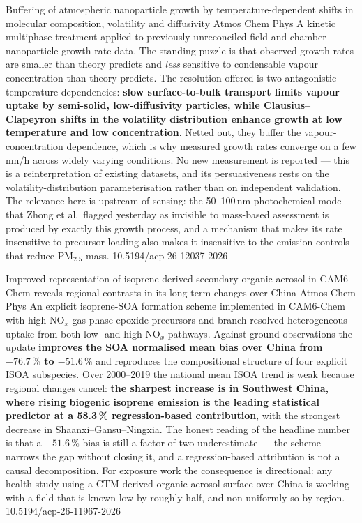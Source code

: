 \documentclass[10pt]{article}
\begin{document}
{Buffering of atmospheric nanoparticle growth by temperature-dependent shifts in molecular composition, volatility and diffusivity}
{Atmos Chem Phys}
{A kinetic multiphase treatment applied to previously unreconciled field and chamber
nanoparticle growth-rate data. The standing puzzle is that observed growth rates are
smaller than theory predicts and \emph{less} sensitive to condensable vapour
concentration than theory predicts. The resolution offered is two antagonistic
temperature dependencies: \textbf{slow surface-to-bulk transport limits vapour uptake by
semi-solid, low-diffusivity particles, while Clausius--Clapeyron shifts in the volatility
distribution enhance growth at low temperature and low concentration}. Netted out, they
buffer the vapour-concentration dependence, which is why measured growth rates converge
on a few nm/h across widely varying conditions. No new measurement is reported --- this
is a reinterpretation of existing datasets, and its persuasiveness rests on the
volatility-distribution parameterisation rather than on independent validation. The
relevance here is upstream of sensing: the 50--100\,nm photochemical mode that Zhong
et al.\ flagged yesterday as invisible to mass-based assessment is produced by exactly
this growth process, and a mechanism that makes its rate insensitive to precursor
loading also makes it insensitive to the emission controls that reduce PM$_{2.5}$ mass.}
{10.5194/acp-26-12037-2026}


{Improved representation of isoprene-derived secondary organic aerosol in CAM6-Chem reveals regional contrasts in its long-term changes over China}
{Atmos Chem Phys}
{An explicit isoprene-SOA formation scheme implemented in CAM6-Chem with high-NO$_x$
gas-phase epoxide precursors and branch-resolved heterogeneous uptake from both low- and
high-NO$_x$ pathways. Against ground observations the update \textbf{improves the SOA
normalised mean bias over China from $-76.7\,\%$ to $-51.6\,\%$} and reproduces the
compositional structure of four explicit ISOA subspecies. Over 2000--2019 the national
mean ISOA trend is weak because regional changes cancel: \textbf{the sharpest increase is
in Southwest China, where rising biogenic isoprene emission is the leading statistical
predictor at a 58.3\,\% regression-based contribution}, with the strongest decrease in
Shaanxi--Gansu--Ningxia. The honest reading of the headline number is that a $-51.6\,\%$
bias is still a factor-of-two underestimate --- the scheme narrows the gap without
closing it, and a regression-based attribution is not a causal decomposition. For
exposure work the consequence is directional: any health study using a CTM-derived
organic-aerosol surface over China is working with a field that is known-low by roughly
half, and non-uniformly so by region.}
{10.5194/acp-26-11967-2026}
\end{document}
